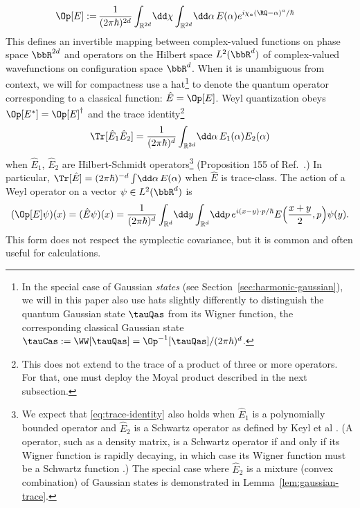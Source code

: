 \documentclass{article}
\numberwithin{equation}{section}
\begin{document}
\begin{align}
\label{eq:weyl-op-def}
\Op[E]:=\,& 
\frac{1}{(2\pi\hbar)^{2d}}
\int_{\mathbb{R}^{2d}}\! \dd \chi \int_{\mathbb{R}^{2d}}\! \dd \alpha\, E(\alpha) e^{i \chi_a (\RQ-\alpha)^a/\hbar}
\end{align}
This defines an invertible mapping between complex-valued functions on phase space $\bbR^{2d}$ and operators on the Hilbert space $L^2(\bbR^d)$ of complex-valued wavefunctions on configuration space $\bbR^d$.  
When it is unambiguous from context, we will for compactness use a hat\footnote{In the special case of Gaussian \emph{states} (see Section~\ref{sec:harmonic-gaussian}), we will in this paper also use hats slightly differently to distinguish the quantum Gaussian state $\tauQas$ from its Wigner function, the corresponding classical Gaussian state $\tauCas:=\WW[\tauQas] = \Op^{-1}[\tauQas]/(2\pi\hbar)^d$.} to denote the quantum operator corresponding to a classical function: $\hat{E} = \Op[E]$.
Weyl quantization obeys $\Op[E^*] = \Op[E]^\dagger$ \cite{dimassi1999spectral, zworski2022semiclassical, degosson2021quantum} and the trace identity\footnote{This does not extend to the trace of a product of three or more operators. For that, one must deploy the Moyal product described in the next subsection.}
\begin{align}\label{eq:trace-identity}
    \Tr[\hat{E}_1 \hat{E}_2] = \frac{1}{(2\pi\hbar)^d}  \int_{\mathbb{R}^{2d}}\! \dd \alpha\, E_1(\alpha)E_2(\alpha)
\end{align}
when $\hat{E}_1$, $\hat{E}_2$ are Hilbert-Schmidt operators\footnote{We expect that \eqref{eq:trace-identity} also holds when $\hat{E}_1$ is a polynomially bounded operator and $\hat{E}_2$ is a Schwartz operator as defined by Keyl et al \cite{keyl2016schwartz}.  (A operator, such as a  density matrix, is a Schwartz operator if and only if its Wigner function is rapidly decaying, in which case its Wigner function must be a Schwartz function \cite{hernandez2022rapidly}.) The special case where $\hat{E}_2$ is a mixture (convex combination) of Gaussian states is demonstrated in Lemma~\ref{lem:gaussian-trace}.} (Proposition 155 of Ref.~\cite{degosson2021quantum}.) In particular, $\Tr[\hat{E}] = (2\pi\hbar)^{-d}  \int\! \dd \alpha\, E(\alpha)$ when $\hat{E}$ is trace-class.
The action of a Weyl operator on a vector $\psi\in L^2(\bbR^d)$ is \cite{zworski2022semiclassical}
\begin{align}
    \label{eq:weyl-op-action-def}
    (\Op[E]\psi)(x) = (\hat{E}\psi)(x) =
    \frac{1}{(2\pi \hbar)^{d}}
    \int_{\mathbb{R}^{d}}\! \dd y \int_{\mathbb{R}^{d}}\! \dd p\, e^{i (x-y)\cdot p/\hbar}
    E\Big(\frac{x+y}{2},p\Big) \psi(y).
\end{align}
This form does not respect the symplectic covariance, but it is common and often useful for calculations.
\end{document}
